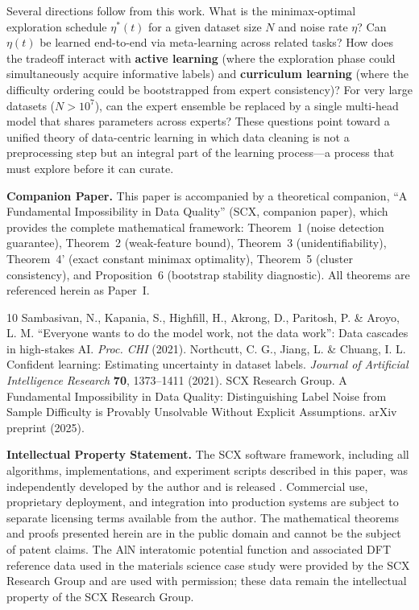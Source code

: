\documentclass[12pt,a4paper]{article}
\begin{document}
Several directions follow from this work. What is the minimax-optimal exploration schedule $\eta^*(t)$ for a given dataset size $N$ and noise rate $\eta$? Can $\eta(t)$ be learned end-to-end via meta-learning across related tasks? How does the tradeoff interact with \textbf{active learning} (where the exploration phase could simultaneously acquire informative labels) and \textbf{curriculum learning} (where the difficulty ordering could be bootstrapped from expert consistency)? For very large datasets ($N > 10^7$), can the expert ensemble be replaced by a single multi-head model that shares parameters across experts? These questions point toward a unified theory of data-centric learning in which data cleaning is not a preprocessing step but an integral part of the learning process---a process that must explore before it can curate.

\begin{flushleft}
\textbf{Companion Paper.} This paper is accompanied by a theoretical companion, ``A Fundamental Impossibility in Data Quality'' (SCX, companion paper), which provides the complete mathematical framework: Theorem~1 (noise detection guarantee), Theorem~2 (weak-feature bound), Theorem~3 (unidentifiability), Theorem~4' (exact constant minimax optimality), Theorem~5 (cluster consistency), and Proposition~6 (bootstrap stability diagnostic). All theorems are referenced herein as Paper~I.

\end{flushleft}

\begin{thebibliography}{10}
 Sambasivan, N., Kapania, S., Highfill, H., Akrong, D., Paritosh, P. \& Aroyo, L. M. ``Everyone wants to do the model work, not the data work'': Data cascades in high-stakes AI. \textit{Proc. CHI} (2021).
 Northcutt, C. G., Jiang, L. \& Chuang, I. L. Confident learning: Estimating uncertainty in dataset labels. \textit{Journal of Artificial Intelligence Research} \textbf{70}, 1373--1411 (2021).
 SCX Research Group. A Fundamental Impossibility in Data Quality: Distinguishing Label Noise from Sample Difficulty is Provably Unsolvable Without Explicit Assumptions. arXiv preprint (2025).
\end{thebibliography}

\textbf{Intellectual Property Statement.}
The SCX software framework, including all algorithms, implementations, and experiment scripts described in this paper, was independently developed by the author and is released . Commercial use, proprietary deployment, and integration into production systems are subject to separate licensing terms available from the author. The mathematical theorems and proofs presented herein are in the public domain and cannot be the subject of patent claims. The AlN interatomic potential function and associated DFT reference data used in the materials science case study were provided by the SCX Research Group and are used with permission; these data remain the intellectual property of the SCX Research Group.
\end{document}
